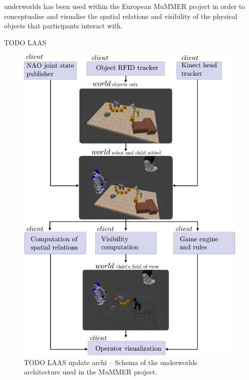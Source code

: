 \documentclass[letterpaper, 10pt, conference]{ieeeconf}
\newcommand{\uwds}{{\sc underworlds}\xspace}
\begin{document}
\uwds has been used within the European MuMMER project
in order to conceptualise and visualise the spatial relations and visibility of
the physical objects that participants interact with.

TODO LAAS

\begin{figure}
    \centering
    \includegraphics[width=0.9\linewidth]{l2tor}
    \caption{TODO LAAS update archi -- Schema of the \uwds architecture used in
    the MuMMER project. }
    \label{fig|mummerarchitecture}
\end{figure}
\end{document}
